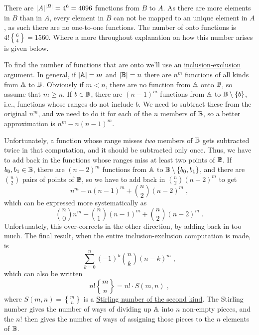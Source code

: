 \documentclass[a4paper, english, 12pt]{article} %
\begin{document}
\begin{answer}
  There are $\lvert A\rvert^{\lvert B\rvert} = 4^6 = 4096$ functions from $B$ to $A$. As there
  are more elements in $B$ than in $A$, every element in $B$ can not be mapped
  to an unique element in $A$, as such there are no one-to-one functions. The
  number of onto functions is $4! {6 \brace 4} = 1560$. Where a more throughout
  explanation on how this number arises is given below.

  To find the number of functions that are onto we’ll use an
  \href{https://en.wikipedia.org/wiki/Inclusion\%E2\%80\%93exclusion_principle}{inclusion-exclusion}
  argument. In general, if $\lvert\Bbb A\rvert = m$ and $\lvert\Bbb B\rvert = n$ there are
  $n^m$ functions of all kinds from $\Bbb A$ to $\Bbb B$. Obviously if $m<n$,
  there are no function from $\Bbb A$ onto $\Bbb B$, so assume that $m\ge n$. If
  $b\in\Bbb B$, there are $(n-1)^m$ functions from $\Bbb A$ to $\Bbb
  B\setminus\{b\}$, i.e., functions whose ranges do not include $b$. We need to
  subtract these from the original $n^m$, and we need to do it for each of the
  $n$ members of $\Bbb B$, so a better approximation is $n^m-n(n-1)^m$.

  Unfortunately, a function whose range misses \emph{two} members of $\Bbb B$ gets
  subtracted twice in that computation, and it should be subtracted only once.
  Thus, we have to add back in the functions whose ranges miss at least two
  points of $\Bbb B$. If $b_0,b_1\in\Bbb B$, there are $(n-2)^m$ functions from
  $\Bbb A$ to $\Bbb B\setminus\{b_0,b_1\}$, and there are $\binom{n}{2}$ pairs
  of points of $\Bbb B$, so we have to add back in $\binom{n}2(n-2)^m$ to get
  \begin{equation*}
    n^m-n(n-1)^m+\binom{n}2(n-2)^m\;,
  \end{equation*}
  which can be expressed more systematically as
  \begin{equation*}
    \binom{n}0n^m-\binom{n}1(n-1)^m+\binom{n}2(n-2)^m\;.
  \end{equation*}
  Unfortunately, this over-corrects in the other direction, by adding back in
  too much. The final result, when the entire inclusion-exclusion computation is
  made, is
  \begin{equation*}
    \sum_{k=0}^n(-1)^k\binom{n}k(n-k)^m\;,
  \end{equation*}
  which can also be written
  \begin{equation*}
    n!{m\brace n} = n! \cdot S(m,n)\;,
  \end{equation*}
  where $S(m,n) = {m\brace n}$ is a
  \href{http://en.wikipedia.org/wiki/Stirling_numbers_of_the_second_kind}{Stirling
    number of the second kind}. The Stirling number gives the number of ways of
  dividing up $\Bbb A$ into $n$ non-empty pieces, and the $n!$ then gives the
  number of ways of assigning those pieces to the $n$ elements of $\Bbb B$.
\end{answer}
\end{document}
